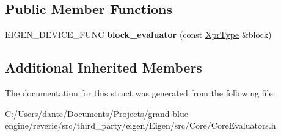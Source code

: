 \subsection*{Public Member Functions}
\begin{DoxyCompactItemize}
\item 
\mbox{\label{struct_eigen_1_1internal_1_1block__evaluator_3_01_arg_type_00_01_block_rows_00_01_block_cols_00_01_inner_panel_00_01true_01_4_a69f3ec8b043f7e351e9382f2b8e938db}} 
E\+I\+G\+E\+N\+\_\+\+D\+E\+V\+I\+C\+E\+\_\+\+F\+U\+NC {\bfseries block\+\_\+evaluator} (const \mbox{\hyperlink{class_eigen_1_1_block}{Xpr\+Type}} \&block)
\end{DoxyCompactItemize}
\subsection*{Additional Inherited Members}


The documentation for this struct was generated from the following file\+:\begin{DoxyCompactItemize}
\item 
C\+:/\+Users/dante/\+Documents/\+Projects/grand-\/blue-\/engine/reverie/src/third\+\_\+party/eigen/\+Eigen/src/\+Core/Core\+Evaluators.\+h\end{DoxyCompactItemize}
